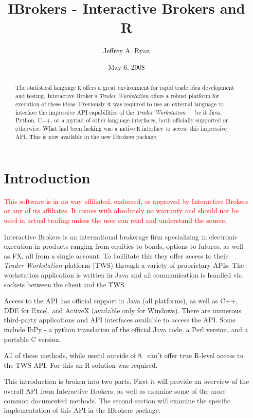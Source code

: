 \documentclass{article}
\title{\bf IBrokers - Interactive Brokers and R }
\author{Jeffrey A. Ryan}
\date{May 6, 2008}
\begin{document}
\maketitle
\tableofcontents

\begin{abstract}
The statistical language {\tt R}
offers a great environment for rapid trade
idea development and testing. Interactive Broker's
\emph{Trader Workstation} offers a
robust platform for execution of these ideas.
Previously it was required to use an external
language to interface the impressive API
capabilities of the \emph{Trader Workstation} --- be
it Java, Python, C++, or a myriad of other
language interfaces, both officially supported
or otherwise.
What had been lacking was a native {\tt R} interface
to access this impressive API.  This is now available
in the new IBrokers package.
\end{abstract}

\section{Introduction}
\textcolor{red}{
This software is in no way affiliated, endorsed, or approved by
     Interactive Brokers or any of its affiliates. It comes with
     absolutely no warranty and should not be used in actual trading
     unless the user can read and understand the source.
}

Interactive Brokers \cite{TWS} is an international brokerage
firm specializing in electronic execution in
products ranging from equities to bonds, options to futures,
as well as FX, all from a single account. To facilitate
this they offer access to their \emph{Trader Workstation}
platform (TWS) through a variety of proprietary APIs.
The workstation application is written
in Java and all communication is handled via sockets
between the client and the TWS.

Access to the API has official support in
Java (all platforms), as well as C++, DDE for Excel, and ActiveX
(available only for Windows). There are numerous third-party
applications and API interfaces available to access the
API. Some include IbPy - a python translation of the
official Java code, a Perl version, and a portable C version.

All of these methods, while useful outside of {\tt R}~\cite{R}
can't offer true R-level access to the TWS API.  For this an
R solution was required.

This introduction is broken into two parts. First
it will provide an overview of the overall
API from Interactive Brokers, as well as examine some of the
more common documented methods. The second section will
examine the specific implementation of this API in the
IBrokers \cite{IBrokers} package.
\end{document}
